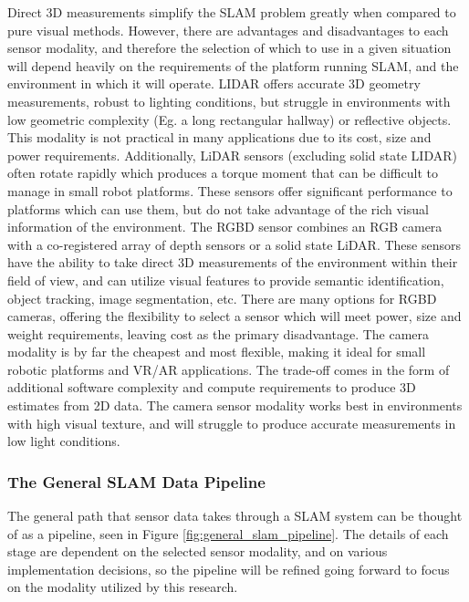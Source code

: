 Direct 3D measurements simplify the SLAM problem greatly when compared to pure visual methods. However, there are advantages and disadvantages to each sensor modality, and therefore the selection of which to use in a given situation will depend heavily on the requirements of the platform running SLAM, and the environment in which it will operate. LIDAR offers accurate 3D geometry measurements, robust to lighting conditions, but struggle in environments with low geometric complexity (Eg. a long rectangular hallway) or reflective objects. This modality is not practical in many applications due to its cost, size and power requirements. Additionally, LiDAR sensors (excluding solid state LIDAR) often rotate rapidly which produces a torque moment that can be difficult to manage in small robot platforms. These sensors offer significant performance to platforms which can use them, but do not take advantage of the rich visual information of the environment. The RGBD sensor combines an RGB camera with a co-registered array of depth sensors or a solid state LiDAR. These sensors have the ability to take direct 3D measurements of the environment within their field of view, and can utilize visual features to provide semantic identification, object tracking, image segmentation, etc. There are many options for RGBD cameras, offering the flexibility to select a sensor which will meet power, size and weight requirements, leaving cost as the primary disadvantage. The camera modality is by far the cheapest and most flexible, making it ideal for small robotic platforms and VR/AR applications. The trade-off comes in the form of additional software complexity and compute requirements to produce 3D estimates from 2D data. The camera sensor modality works best in environments with high visual texture, and will struggle to produce accurate measurements in low light conditions.

\subsubsection{The General SLAM Data Pipeline}
The general path that sensor data takes through a SLAM system can be thought of as a pipeline, seen in Figure \ref{fig:general_slam_pipeline}. The details of each stage are dependent on the selected sensor modality, and on various implementation decisions, so the pipeline will be refined going forward to focus on the modality utilized by this research.

